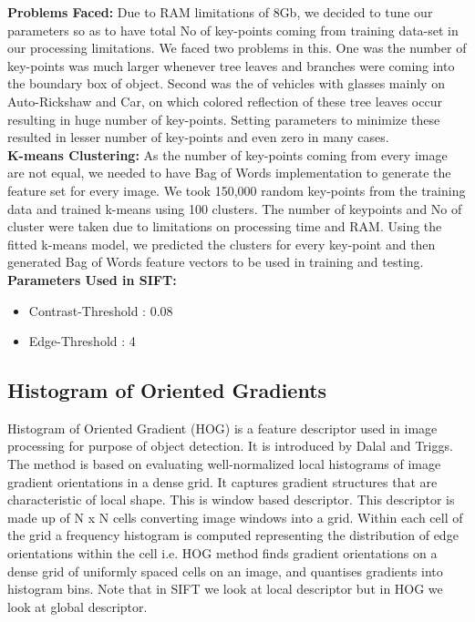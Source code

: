 \documentclass[paper=a4, fontsize=11pt]{scrartcl}
\numberwithin{equation}{section}		%
\numberwithin{figure}{section}			%
\numberwithin{table}{section}				%
\begin{document}
\noindent \textbf{Problems Faced:} Due to RAM limitations of 8Gb, we decided to tune our parameters so as to have total No of key-points coming from training data-set in our processing limitations. We faced two problems in this. One was the number of key-points was much larger whenever tree leaves and branches were coming into the boundary box of object. Second was the of vehicles with glasses mainly on Auto-Rickshaw and Car, on which colored reflection of these tree leaves occur resulting in huge number of key-points. Setting parameters to minimize these resulted in lesser number of key-points and even zero in many cases. \\

\noindent \textbf{K-means Clustering:} As the number of key-points coming from every image are not equal, we needed to have Bag of Words implementation to generate the feature set for every image. We took 150,000 random key-points from the training data and trained k-means using 100 clusters. The number of keypoints and No of cluster were taken due to limitations on processing time and RAM. Using the fitted k-means model, we predicted the clusters for every key-point and then generated Bag of Words feature vectors to be used in training and testing. \\

\noindent \textbf{Parameters Used in SIFT:}
\begin{itemize} \setlength\itemsep{-5pt}
\item Contrast-Threshold		:	0.08
\item Edge-Threshold 		:	 4 
\end{itemize}

\subsection*{\textbf{Histogram of Oriented Gradients}}
Histogram of Oriented Gradient (HOG) is a feature descriptor used in image processing for purpose of object detection. It is introduced by Dalal and Triggs. The method is based on evaluating well-normalized local histograms of image gradient orientations in a dense grid. It captures gradient structures that are characteristic of local shape. This is window based descriptor. This descriptor is made up of N x N cells converting image windows into a grid. Within each cell of the grid a frequency histogram is computed representing the distribution of edge orientations within the cell i.e. HOG method finds gradient orientations on a dense grid of uniformly spaced cells on an image, and quantises gradients into histogram bins. Note that in SIFT we look at local descriptor but in HOG we look at global descriptor.\\
\end{document}
